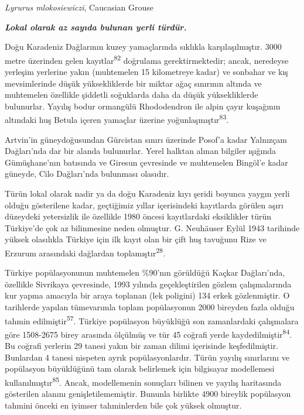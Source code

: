 \documentclass[
  letterpaper,
  DIV=11,
  numbers=noendperiod]{scrreprt}
\begin{document}
\emph{Lyrurus mlokosiewiczi}, Caucasian Grouse

\textbf{\emph{Lokal olarak az sayıda bulunan yerli türdür.}}

Doğu Karadeniz Dağlarının kuzey yamaçlarında sıklıkla karşılaşılmıştır.
3000 metre üzerinden gelen kayıtlar\textsuperscript{82} doğrulama
gerektirmektedir; ancak, neredeyse yerleşim yerlerine yakın (muhtemelen
15 kilometreye kadar) ve sonbahar ve kış mevsimlerinde düşük
yüksekliklerde bir miktar ağaç sınırının altında ve muhtemelen özellikle
şiddetli soğuklarda daha da düşük yüksekliklerde bulunurlar. Yayılış
bodur ormangülü Rhododendron ile alpin çayır kuşağının altındaki huş
Betula içeren yamaçlar üzerine yoğunlaşmıştır\textsuperscript{83}.

Artvin'in güneydoğusundan Gürcistan sınırı üzerinde Posof'a kadar
Yalnızçam Dağları'nda dar bir alanda bulunurlar. Yerel halktan alınan
bilgiler ışığında Gümüşhane'nın batısında ve Giresun çevresinde ve
muhtemelen Bingöl'e kadar güneyde, Cilo Dağları'nda bulunması olasıdır.

Türün lokal olarak nadir ya da doğu Karadeniz kıyı şeridi boyunca yaygın
yerli olduğu gösterilene kadar, geçtiğimiz yıllar içerisindeki
kayıtlarda görülen aşırı düzeydeki yetersizlik ile özellikle 1980 öncesi
kayıtlardaki eksiklikler türün Türkiye'de çok az bilinmesine neden
olmuştur. G. Neuhäuser Eylül 1943 tarihinde yüksek olasılıkla Türkiye
için ilk kayıt olan bir çift huş tavuğunu Rize ve Erzurum arasındaki
dağlardan toplamıştır\textsuperscript{28}.

Türkiye popülasyonunun muhtemelen \%90'nın görüldüğü Kaçkar Dağları'nda,
özellikle Sivrikaya çevresinde, 1993 yılında geçekleştirilen gözlem
çalışmalarında kur yapma amacıyla bir araya toplanan (lek poligini) 134
erkek gözlenmiştir. O tarihlerde yapılan tümevarımla toplam popülasyonun
2000 bireyden fazla olduğu tahmin edilmiştir\textsuperscript{57}.
Türkiye popülasyon büyüklüğü son zamanlardaki çalışmalara göre 1508-2675
birey arasında ölçülmüş ve tür 45 coğrafi yerde
kaydedilmiştir\textsuperscript{84}. Bu coğrafi yerlerin 29 tanesi yakın
bir zaman dilimi içerisinde keşfedilmiştir. Bunlardan 4 tanesi nispeten
ayrık popülasyonlardır. Türün yayılış sınırlarını ve popülasyon
büyüklüğünü tam olarak belirlemek için bilgisayar modellemesi
kullanılmıştır\textsuperscript{85}. Ancak, modellemenin sonuçları
bilinen ve yayılış haritasında gösterilen alanını genişletilememiştir.
Bununla birlikte 4900 bireylik popülasyon tahmini önceki en iyimser
tahminlerden bile çok yüksek olmuştur.
\end{document}
